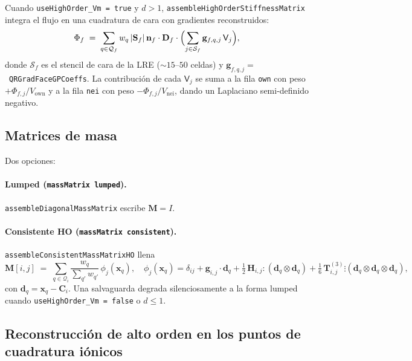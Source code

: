 \documentclass[11pt,a4paper]{article}
\newcommand{\code}[1]{\texttt{\small #1}}
\newcommand{\Dten}{\mathbf{D}}
\newcommand{\Mmass}{\mathbf{M}}
\begin{document}
Cuando \code{useHighOrder\_Vm = true} y $d>1$,
\code{assembleHighOrderStiffnessMatrix} integra el flujo en una cuadratura de cara
con gradientes reconstruidos:
\begin{equation}
  \Phi_{f} \;=\;
   \sum_{q \in \mathcal{Q}_{f}}
       w_{q}\, \lvert \mathbf{S}_{f} \rvert\,
       \mathbf{n}_{f} \cdot \Dten_{f} \cdot
       \Bigl(
         \sum_{j \in \mathcal{S}_{f}}
            \mathbf{g}_{f,q,j}\, \mathsf{V}_{j}
       \Bigr),
   \label{eq:HO-flux}
\end{equation}
donde $\mathcal{S}_{f}$ es el stencil de cara de la LRE ($\sim 15$--$50$ celdas)
y $\mathbf{g}_{f,q,j} = $~\code{QRGradFaceGPCoeffs}. La contribución de cada
$\mathsf{V}_{j}$ se suma a la fila \code{own} con peso $+\Phi_{f,j}/V_{\text{own}}$
y a la fila \code{nei} con peso $-\Phi_{f,j}/V_{\text{nei}}$, dando un Laplaciano
semi-definido negativo.

\subsection{Matrices de masa}

Dos opciones:
\paragraph{Lumped (\code{massMatrix lumped}).}
\code{assembleDiagonalMassMatrix} escribe $\Mmass = I$.

\paragraph{Consistente HO (\code{massMatrix consistent}).}
\code{assembleConsistentMassMatrixHO} llena
\begin{equation}
  \Mmass[i, j] \;=\;
   \sum_{q \in \mathcal{Q}_{i}}
       \frac{w_{q}}{\sum_{q'} w_{q'}}\,
       \phi_{j}(\mathbf{x}_{q}),
   \quad
   \phi_{j}(\mathbf{x}_{q})
    = \delta_{ij}
    + \mathbf{g}_{i,j} \cdot \mathbf{d}_{q}
    + \tfrac{1}{2}\, \mathbf{H}_{i,j} \!:\! (\mathbf{d}_{q} \otimes \mathbf{d}_{q})
    + \tfrac{1}{6}\, \mathbf{T}^{(3)}_{i,j} \!\vdots\!
        (\mathbf{d}_{q} \otimes \mathbf{d}_{q} \otimes \mathbf{d}_{q}),
   \label{eq:HO-mass}
\end{equation}
con $\mathbf{d}_{q} = \mathbf{x}_{q} - \mathbf{C}_{i}$. Una salvaguarda degrada
silenciosamente a la forma lumped cuando \code{useHighOrder\_Vm = false} o
$d \le 1$.

\subsection{Reconstrucción de alto orden en los puntos de cuadratura iónicos}
\end{document}
